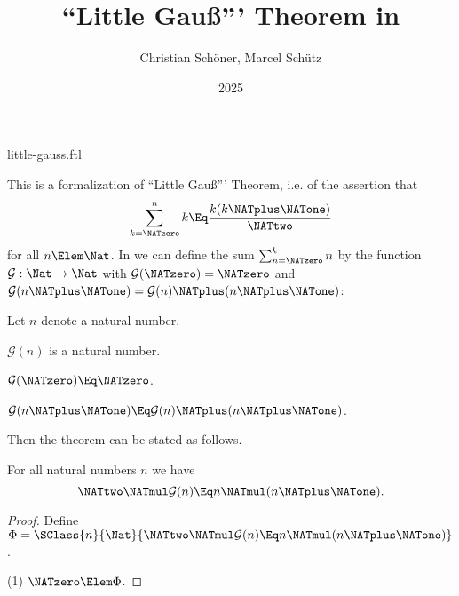 \documentclass{stex}
\title{``Little Gauß''' Theorem in \Naproche}
\author{Christian Schöner, Marcel Schütz}
\date{2025}
\newcommand{\gauss}{\mathcal{G}}
\begin{document}
\begin{smodule}{little-gauss.ftl}
\maketitle



\noindent This is a formalization of ``Little Gauß''' Theorem, i.e. of
the assertion that
\[\sum_{k = \NATzero}^n k \Eq \frac{k(k \NATplus \NATone)}\NATtwo\]
for all $n \Elem \Nat$.
In \Naproche we can define the sum $\sum_{n = \NATzero}^k n$ by the function
$\gauss : \Nat \to \Nat$ with $\gauss(\NATzero) = \NATzero$ and
$\gauss(n \NATplus \NATone) = \gauss(n) \NATplus (n \NATplus \NATone)$:

\begin{forthel}
  Let $n$ denote a natural number.

  \begin{signature*}
    $\gauss(n)$ is a natural number.
  \end{signature*}

  \begin{axiom*}
    $\gauss(\NATzero) \Eq \NATzero$.
  \end{axiom*}

  \begin{axiom*}
    $\gauss(n \NATplus \NATone) \Eq \gauss(n) \NATplus (n \NATplus \NATone)$.
  \end{axiom*}
\end{forthel}

\noindent Then the theorem can be stated as follows.

\begin{forthel}
  \begin{theorem*}[title=Little Gauß,name=Little Gauss]
    For all natural numbers $n$ we have
    \[\NATtwo \NATmul \gauss(n) \Eq n \NATmul (n \NATplus \NATone).\]
  \end{theorem*}
  \begin{proof}
    Define $\Phi = \SClass{n}{\Nat}{\NATtwo \NATmul \gauss(n) \Eq n \NATmul (n \NATplus \NATone)}$.
    
    (1) $\NATzero \Elem \Phi$.


\end{proof}
\end{forthel}
\end{smodule}
\end{document}
